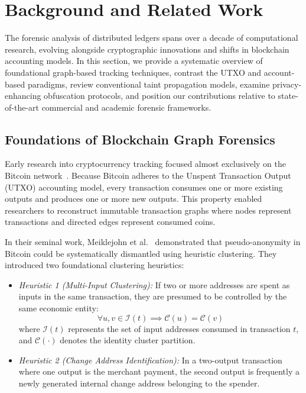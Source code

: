 \section{Background and Related Work}
\label{sec:related_work}

The forensic analysis of distributed ledgers spans over a decade of computational research, evolving alongside cryptographic innovations and shifts in blockchain accounting models. In this section, we provide a systematic overview of foundational graph-based tracking techniques, contrast the UTXO and account-based paradigms, review conventional taint propagation models, examine privacy-enhancing obfuscation protocols, and position our contributions relative to state-of-the-art commercial and academic forensic frameworks.

\subsection{Foundations of Blockchain Graph Forensics}

Early research into cryptocurrency tracking focused almost exclusively on the Bitcoin network~\cite{nakamoto2008bitcoin}. Because Bitcoin adheres to the Unspent Transaction Output (UTXO) accounting model, every transaction consumes one or more existing outputs and produces one or more new outputs. This property enabled researchers to reconstruct immutable transaction graphs where nodes represent transactions and directed edges represent consumed coins.

In their seminal work, Meiklejohn et al.~\cite{meiklejohn2013fistful} demonstrated that pseudo-anonymity in Bitcoin could be systematically dismantled using heuristic clustering. They introduced two foundational clustering heuristics:
\begin{itemize}
    \item \emph{Heuristic 1 (Multi-Input Clustering):} If two or more addresses are spent as inputs in the same transaction, they are presumed to be controlled by the same economic entity:
    \begin{equation}
        \forall u, v \in \mathcal{I}(t) \implies \mathcal{C}(u) = \mathcal{C}(v)
    \end{equation}
    where $\mathcal{I}(t)$ represents the set of input addresses consumed in transaction $t$, and $\mathcal{C}(\cdot)$ denotes the identity cluster partition.
    \item \emph{Heuristic 2 (Change Address Identification):} In a two-output transaction where one output is the merchant payment, the second output is frequently a newly generated internal change address belonging to the spender.
\end{itemize}

